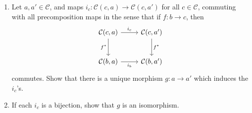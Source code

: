 \begin{exercise}\label{ex:1-2-9}
	\begin{enumerate}
		\item Let $a,a'\in \mathcal{C} $, and maps $i_c : \mathcal{C} (c,a) \to \mathcal{C} (c,a')$ for all $c\in \mathcal{C} $, commuting with all precomposition maps in the sense that if $f : b \to c$, then
			\[\begin{tikzcd}[row sep = 2.5em, column sep = 2.5em]
				\mathcal{C} (c,a)\ar[" i_c ", r] \ar[" f^* "', d]  & \mathcal{C} (c,a')\ar[" f^* ", d]  \\
			\mathcal{C} (b,a)\ar[" i_b "', r]  & \mathcal{C} (b,a')
			\end{tikzcd}\]
			commutes. Show that there is a unique morphism $g : a \to a'$ which induces the $i_c$'s.
		\item If each $i_c$ is a bijection, show that $g$ is an isomorphism.
	\end{enumerate}
\end{exercise}
